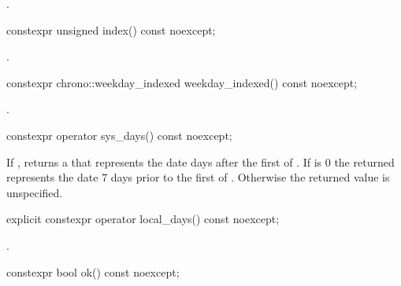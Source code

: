 \begin{itemdescr}
\pnum
\returns {}.
\end{itemdescr}

%
\begin{itemdecl}
constexpr unsigned index() const noexcept;
\end{itemdecl}

\begin{itemdescr}
\pnum
\returns {}.
\end{itemdescr}

%
\begin{itemdecl}
constexpr chrono::weekday_indexed weekday_indexed() const noexcept;
\end{itemdecl}

\begin{itemdescr}
\pnum
\returns {}.
\end{itemdescr}

%
\begin{itemdecl}
constexpr operator sys_days() const noexcept;
\end{itemdecl}

\begin{itemdescr}
\pnum
\returns
If ,
returns a  that
represents the date  days after
the first  of .
If  is 0
the returned 
represents the date 7 days prior to
the first  of .
Otherwise the returned value is unspecified.
\end{itemdescr}

%
\begin{itemdecl}
explicit constexpr operator local_days() const noexcept;
\end{itemdecl}

\begin{itemdescr}
\pnum
\returns {}.
\end{itemdescr}

%
\begin{itemdecl}
constexpr bool ok() const noexcept;
\end{itemdecl}

